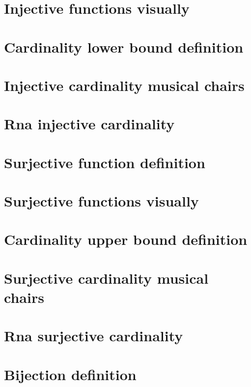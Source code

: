 \section*{Injective functions visually}

\vfill
\section*{Cardinality lower bound definition}

\vfill
\section*{Injective cardinality musical chairs}

\vfill
\section*{Rna injective cardinality}

\vfill
\section*{Surjective function definition}

\vfill
\section*{Surjective functions visually}

\vfill
\section*{Cardinality upper bound definition}

\vfill
\section*{Surjective cardinality musical chairs}

\vfill
\section*{Rna surjective cardinality}

\vfill
\section*{Bijection definition}

\vfill
